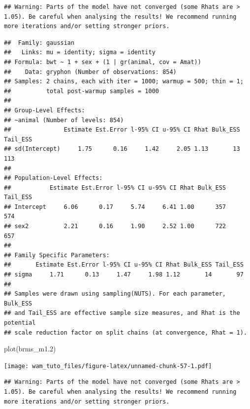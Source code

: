\documentclass[
  12pt,
]{book}
\newenvironment{Shaded}{\begin{snugshade}}{\end{snugshade}}
\newcommand{\FloatTok}[1]{\textcolor[rgb]{0.00,0.00,0.81}{#1}}
\newcommand{\FunctionTok}[1]{\textcolor[rgb]{0.00,0.00,0.00}{#1}}
\newcommand{\NormalTok}[1]{#1}
\newcommand{\SpecialCharTok}[1]{\textcolor[rgb]{0.00,0.00,0.00}{#1}}
\begin{document}
\begin{verbatim}
## Warning: Parts of the model have not converged (some Rhats are > 1.05). Be careful when analysing the results! We recommend running more iterations and/or setting stronger priors.
\end{verbatim}

\begin{verbatim}
##  Family: gaussian 
##   Links: mu = identity; sigma = identity 
## Formula: bwt ~ 1 + sex + (1 | gr(animal, cov = Amat)) 
##    Data: gryphon (Number of observations: 854) 
## Samples: 2 chains, each with iter = 1000; warmup = 500; thin = 1;
##          total post-warmup samples = 1000
## 
## Group-Level Effects: 
## ~animal (Number of levels: 854) 
##               Estimate Est.Error l-95% CI u-95% CI Rhat Bulk_ESS Tail_ESS
## sd(Intercept)     1.75      0.16     1.42     2.05 1.13       13      113
## 
## Population-Level Effects: 
##           Estimate Est.Error l-95% CI u-95% CI Rhat Bulk_ESS Tail_ESS
## Intercept     6.06      0.17     5.74     6.41 1.00      357      574
## sex2          2.21      0.16     1.90     2.52 1.00      722      657
## 
## Family Specific Parameters: 
##       Estimate Est.Error l-95% CI u-95% CI Rhat Bulk_ESS Tail_ESS
## sigma     1.71      0.13     1.47     1.98 1.12       14       97
## 
## Samples were drawn using sampling(NUTS). For each parameter, Bulk_ESS
## and Tail_ESS are effective sample size measures, and Rhat is the potential
## scale reduction factor on split chains (at convergence, Rhat = 1).
\end{verbatim}

\begin{Shaded}
\begin{Highlighting}[]
\FunctionTok{plot}\NormalTok{(brms\_m1}\FloatTok{.2}\NormalTok{)}
\end{Highlighting}
\end{Shaded}

\texttt{[image: wam\_tuto\_files/figure-latex/unnamed-chunk-57-1.pdf]}

\begin{Shaded}
\end{Shaded}

\begin{verbatim}
## Warning: Parts of the model have not converged (some Rhats are > 1.05). Be careful when analysing the results! We recommend running more iterations and/or setting stronger priors.
\end{verbatim}
\end{document}
